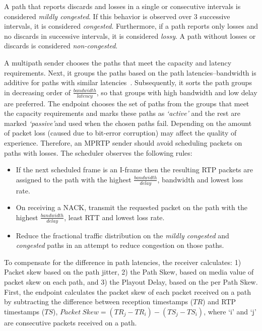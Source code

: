 A path that reports discards and losses in a single or consecutive intervals
is considered \emph{mildly congested}. If this behavior is observed over 3
successive intervals, it is considered \emph{congested}. Furthermore, if a
path reports only losses and no discards in successive intervals, it is
considered \emph{lossy}. A path without losses or discards is considered
\emph{non-congested}.

A multipath sender chooses the paths that meet the capacity and latency
requirements. Next, it groups the paths based on the path latencies--bandwidth
is additive for paths with similar latencies~\cite{Wischik:2008:RPP}.
Subsequently, it sorts the path groups in decreasing order of
$\frac{bandwidth}{latency}$, so that groups with high bandwidth and low delay
are preferred. The endpoint chooses the set of paths from the groups that meet
the capacity requirements and marks these paths as \emph{`active'} and the
rest are marked \emph{`passive'}and used when the chosen paths fail. Depending
on the amount of packet loss (caused due to bit-error corruption) may affect
the quality of experience. Therefore, an MPRTP sender should avoid scheduling
packets on paths with losses. The scheduler observes the following rules:

\begin{itemize}
\setlength{\itemsep}{0pt}

  \item If the next scheduled frame is an I-frame then the resulting RTP
  packets are assigned to the path with the highest $\frac{bandwidth}{delay}$,
  bandwidth and lowest loss rate.

  \item On receiving a NACK, transmit the requested packet on the path with
  the highest $\frac{bandwidth}{delay}$, least RTT and lowest loss rate.

  \item Reduce the fractional traffic distribution on the \emph{mildly
  congested} and \emph{congested} paths in an attempt to reduce congestion on
  those paths.

\end{itemize}

To compensate for the difference in path latencies, the receiver calculates:
1) Packet skew based on the path jitter, 2) the Path Skew, based on media
value of packet skew on each path, and 3) the Playout Delay, based on the per
Path Skew. First, the endpoint calculates the packet skew of each packet
received on a path by subtracting the difference between reception timestamps
($TR$) and RTP timestamps ($TS$), $Packet\ Skew = (TR_j - TR_i) - (TS_j -
TS_i)$, where `i' and `j' are consecutive packets received on a path.

